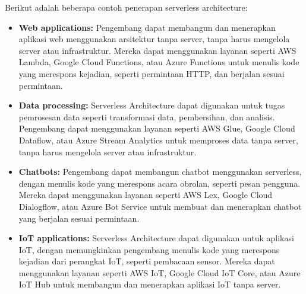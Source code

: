 \documentclass[a4paper,12pt]{article}
\begin{document}
	Berikut adalah beberapa contoh penerapan serverless architecture:
	\begin{itemize}
		\item \textbf{Web applications:} Pengembang dapat membangun dan menerapkan aplikasi web menggunakan arsitektur tanpa server, tanpa harus mengelola server atau infrastruktur. Mereka dapat menggunakan layanan seperti AWS Lambda, Google Cloud Functions, atau Azure Functions untuk menulis kode yang merespons kejadian, seperti permintaan HTTP, dan berjalan sesuai permintaan.
		\item \textbf{Data processing:} Serverless Architecture dapat digunakan untuk tugas pemrosesan data seperti transformasi data, pembersihan, dan analisis. Pengembang dapat menggunakan layanan seperti AWS Glue, Google Cloud Dataflow, atau Azure Stream Analytics untuk memproses data tanpa server, tanpa harus mengelola server atau infrastruktur.
		\item \textbf{Chatbots:} Pengembang dapat membangun chatbot menggunakan serverless, dengan menulis kode yang merespons acara obrolan, seperti pesan pengguna. Mereka dapat menggunakan layanan seperti AWS Lex, Google Cloud Dialogflow, atau Azure Bot Service untuk membuat dan menerapkan chatbot yang berjalan sesuai permintaan.
		\item \textbf {IoT applications:} Serverless Architecture dapat digunakan untuk aplikasi IoT, dengan memungkinkan pengembang menulis kode yang merespons kejadian dari perangkat IoT, seperti pembacaan sensor. Mereka dapat menggunakan layanan seperti AWS IoT, Google Cloud IoT Core, atau Azure IoT Hub untuk membangun dan menerapkan aplikasi IoT tanpa server.
	\end{itemize}
\end{document}
